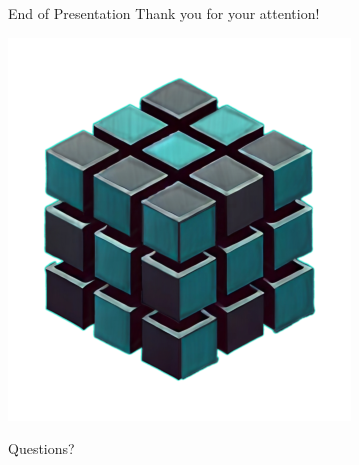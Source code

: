 \begin{frame}{End of Presentation}
  \centering
    \Large Thank you for your attention!
    \vspace{0.1cm}
    \begin{center}
        \includegraphics[scale=0.4]{figures/tm-logo-nobg-quarter.png}
    \end{center}
    \Large Questions?
\end{frame}